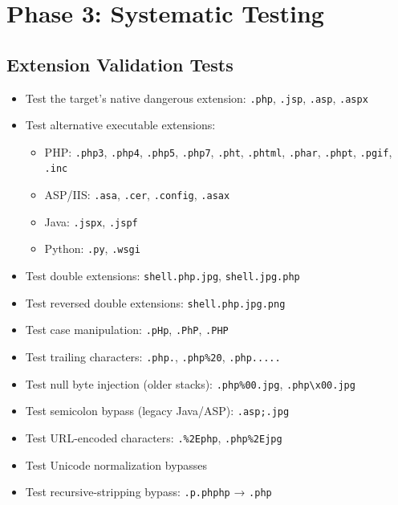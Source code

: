 \documentclass[11pt]{article}
\begin{document}
\section{Phase 3: Systematic Testing}

\subsection{Extension Validation Tests}

\begin{checklistbox}
\begin{itemize}
    \item[\checkmark] Test the target's native dangerous extension: \texttt{.php}, \texttt{.jsp}, \texttt{.asp}, \texttt{.aspx}
    \item[\checkmark] Test alternative executable extensions:
    \begin{itemize}
        \item PHP: \texttt{.php3}, \texttt{.php4}, \texttt{.php5}, \texttt{.php7}, \texttt{.pht}, \texttt{.phtml}, \texttt{.phar}, \texttt{.phpt}, \texttt{.pgif}, \texttt{.inc}
        \item ASP/IIS: \texttt{.asa}, \texttt{.cer}, \texttt{.config}, \texttt{.asax}
        \item Java: \texttt{.jspx}, \texttt{.jspf}
        \item Python: \texttt{.py}, \texttt{.wsgi}
    \end{itemize}
    \item[\checkmark] Test double extensions: \texttt{shell.php.jpg}, \texttt{shell.jpg.php}
    \item[\checkmark] Test reversed double extensions: \texttt{shell.php.jpg.png}
    \item[\checkmark] Test case manipulation: \texttt{.pHp}, \texttt{.PhP}, \texttt{.PHP}
    \item[\checkmark] Test trailing characters: \texttt{.php.}, \texttt{.php\%20}, \texttt{.php.....}
    \item[\checkmark] Test null byte injection (older stacks): \texttt{.php\%00.jpg}, \texttt{.php\textbackslash x00.jpg}
    \item[\checkmark] Test semicolon bypass (legacy Java/ASP): \texttt{.asp;.jpg}
    \item[\checkmark] Test URL-encoded characters: \texttt{.\%2Ephp}, \texttt{.php\%2Ejpg}
    \item[\checkmark] Test Unicode normalization bypasses
    \item[\checkmark] Test recursive-stripping bypass: \texttt{.p.phphp} → \texttt{.php}
\end{itemize}
\end{checklistbox}
\end{document}
